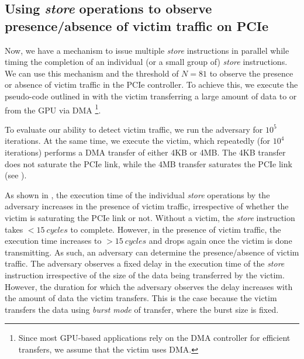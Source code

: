 \subsection{Using \textit{store} operations to observe presence/absence of victim traffic on PCIe}
\label{subsec:interconnect-sc-store-ops-measuring-time}
Now, we have a mechanism to issue multiple \textit{store} instructions in parallel while timing the completion of an individual (or a small group of) \textit{store} instructions.
We can use this mechanism and the threshold of $N = 81$ to observe the presence or absence of victim traffic in the PCIe controller.
To achieve this, we execute the pseudo-code outlined in  with the victim transferring a large amount of data to or from the GPU via DMA
\footnote{Since most GPU-based applications rely on the DMA controller for efficient transfers, we assume that the victim uses DMA.}.

To evaluate our ability to detect victim traffic, we run the adversary for $10^5$ iterations.
At the same time, we execute the victim, which repeatedly (for $10^4$ iterations) performs a DMA transfer of either 4KB or 4MB.
The 4KB transfer does not saturate the PCIe link, while the 4MB transfer saturates the PCIe link (see ).

As shown in , the execution time of the individual \textit{store} operations by the adversary increases in the presence of victim traffic, irrespective of whether the victim is saturating the PCIe link or not.
Without a victim, the \textit{store} instruction takes $<15~cycles$ to complete. However, in the presence of victim traffic, the execution time increases to $>15~cycles$ and drops again once the victim is done transmitting.
As such, an adversary can determine the presence/absence of victim traffic.
The adversary observes a fixed delay in the execution time of the \textit{store} instruction irrespective of the size of the data being transferred by the victim.
However, the duration for which the adversary observes the delay increases with the amount of data the victim transfers.
This is the case because the victim transfers the data using \textit{burst mode} of transfer, where the burst size is fixed.


